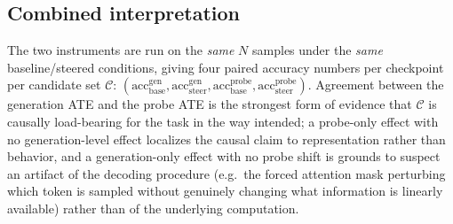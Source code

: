 \subsection{Combined interpretation}

The two instruments are run on the \emph{same} $N$ samples under the
\emph{same} baseline/steered conditions, giving four paired accuracy
numbers per checkpoint per candidate set $\mathcal{C}$:
$(\text{acc}^{\text{gen}}_{\text{base}}, \text{acc}^{\text{gen}}_{\text{steer}},
\text{acc}^{\text{probe}}_{\text{base}}, \text{acc}^{\text{probe}}_{\text{steer}})$.
Agreement between the generation ATE and the probe ATE is the strongest
form of evidence that $\mathcal{C}$ is causally load-bearing for the task
in the way intended; a probe-only effect with no generation-level effect
localizes the causal claim to representation rather than behavior, and a
generation-only effect with no probe shift is grounds to suspect an
artifact of the decoding procedure (e.g.\ the forced attention mask
perturbing which token is sampled without genuinely changing what
information is linearly available) rather than of the underlying
computation.
